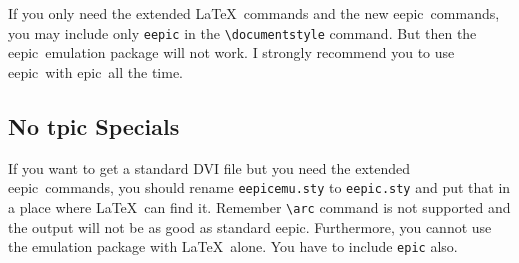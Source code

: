 \documentclass[11pt]{article}
\newcommand{\epic}{{\sc epic}}
\newcommand{\eepic}{{\sc eepic}}
\begin{document}
If you only need the extended \LaTeX\ commands and the new
\eepic\ commands, you may include only \verb|eepic| in the
\verb|\documentstyle| command. But then the \eepic\ emulation
package will not work. I strongly recommend you to use
\eepic\ with \epic\ all the time.

\subsection{No tpic Specials}
If you want to get a standard DVI file but you need the extended
\eepic\ commands, you should rename \verb|eepicemu.sty| to
\verb|eepic.sty| and put that in a place where \LaTeX\ can find
it. Remember \verb|\arc| command is not supported and the output
will not be as good as standard \eepic. Furthermore, you cannot
use the emulation package with \LaTeX\ alone. You have to include
\verb|epic| also.
\end{document}
